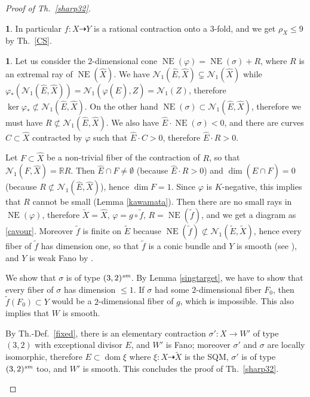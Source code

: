 \documentclass[a4paper,12pt]{amsart}
\theoremstyle{definition}
\newtheorem{prg}[thm]{}
\numberwithin{figure}{section}
\numberwithin{table}{section}
\newcommand{\ph}{\varphi}
\newcommand{\w}{\widetilde}
\newcommand{\wi}{\widehat}
\newcommand{\R}{\mathbb{R}}
\newcommand{\N}{\mathcal{N}_1}
\newcommand{\dom}{\operatorname{dom}}
\newcommand{\NE}{\operatorname{NE}}
\newcommand{\sm}{\text{\it sm}}
\begin{document}
\begin{proof}[Proof of Th.~\ref{sharp32}]
\begin{prg}
 In particular $f\colon X\dasharrow Y$ is a rational contraction onto a $3$-fold, and we get $\rho_X\leq 9$ by Th.~\ref{CS}.
\end{prg}
\begin{prg}
Let us consider the $2$-dimensional cone $\NE(\ph)=\NE(\sigma)+R$, where $R$ is an extremal ray of $\NE(\wi{X})$.
We have $\N(\wi{E},\wi{X})\subsetneq \N(\wi{X})$ while $\ph_*(\N(\wi{E},\wi{X}))=\N(\ph(\wi{E}),Z)=\N(Z)$, therefore $\ker\ph_*\not\subset\N(\wi{E},\wi{X})$. On the other hand $\NE(\sigma)\subset \N(\wi{E},\wi{X})$, therefore we must have
$R\not\subset \N(\wi{E},\wi{X})$. We also have $\wi{E}\cdot\NE(\sigma)<0$, and there are curves $C\subset\wi{X}$ contracted by $\ph$ such that $\wi{E}\cdot C>0$, therefore $\wi{E}\cdot R>0$.

Let $F\subset\wi{X}$ be a non-trivial fiber of the contraction of $R$, so that $\N(F,\wi{X})=\R R$. Then $\wi{E}\cap F\neq\emptyset $ (because $\wi{E}\cdot R>0$) and $\dim(\wi{E}\cap F)=0$ (because $R\not\subset \N(\wi{E},\wi{X})$), hence $\dim F=1$.
Since $\ph$ is $K$-negative, this implies that $R$ cannot be small (Lemma \ref{kawamata}). Then there are no small rays in $\NE(\ph)$, therefore $\w{X}=\wi{X}$, $\ph=g\circ\tilde{f}$, $R=\NE(\tilde{f})$, and we get a diagram as \eqref{cavour}. 
Moreover
$\tilde{f}$ is finite on $\w{E}$ because $\NE(\tilde{f})\not\subset \N(\w{E},\w{X})$, hence
every fiber of $\tilde{f}$ has dimension one, so that $\tilde{f}$ is a conic bundle and $Y$ is smooth (see \cite[Th.~(1.2)]{wisn}), and $Y$ is weak Fano by \cite[Cor.~6.4]{3folds}.

We show that $\sigma$ is of type $(3,2)^{\sm}$. By Lemma \ref{singtarget}, we have to show that every fiber of $\sigma$ has dimension $\leq 1$. If $\sigma$ had some $2$-dimensional fiber $F_0$, then $\tilde{f}(F_0)\subset Y$ would be a $2$-dimensional fiber of $g$, which is impossible. This also implies that $W$ is smooth.

By Th.-Def.~\ref{fixed}, there is an elementary contraction $\sigma'\colon X\to W'$ of type $(3,2)$ with exceptional divisor $E$, and $W'$ is Fano; moreover $\sigma'$ and $\sigma$ are locally isomorphic, therefore $E\subset\dom\xi$ where $\xi\colon X\dasharrow\w{X}$ is the SQM, $\sigma'$ is of type $(3,2)^{\sm}$ too, and $W'$ is smooth. This concludes the proof of Th.~\ref{sharp32}.
\qedhere
\end{prg}
\end{proof}
\end{document}
